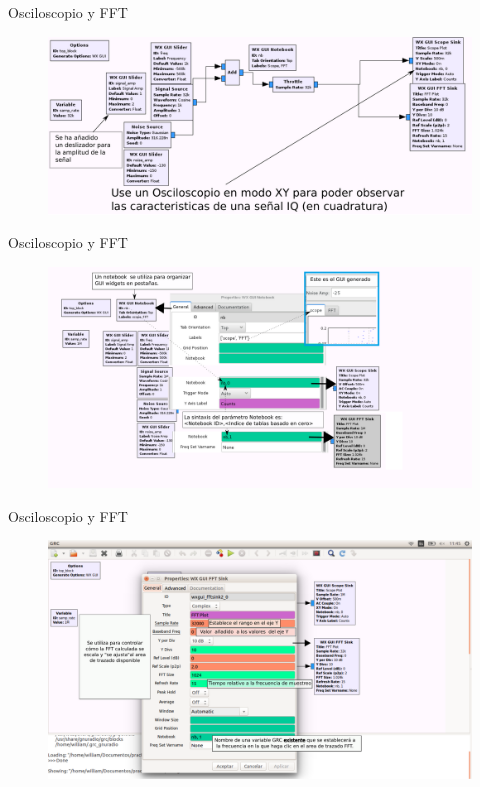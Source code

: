 \begin{frame}{Osciloscopio y FFT}
\begin{figure}[H]
\centering
\includegraphics[width=\textwidth]{lab2/pdf/lab206.pdf}
\end{figure}
\end{frame}

\begin{frame}{Osciloscopio y FFT}
\begin{figure}[H]
\centering
\includegraphics[width=\textwidth]{lab2/pdf/lab207.pdf}
\end{figure}
\end{frame}

\begin{frame}{Osciloscopio y FFT}
\begin{figure}[H]
\centering
\includegraphics[width=\textwidth]{lab2/pdf/lab208.pdf}
\end{figure}
\end{frame}

